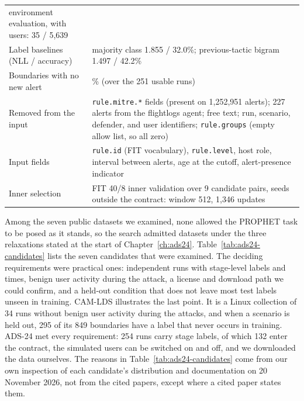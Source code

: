 \begin{table}[htbp]
\begin{tabularx}{\textwidth}{@{}>{\raggedright\arraybackslash}p{}>{\raggedright\arraybackslash}X@{}}
  environment evaluation, with users: 35 / 5,639 \\
Label baselines (NLL / accuracy) & majority class 1.855 / 32.0\%;
  previous-tactic bigram 1.497 / 42.2\% \\
Boundaries with no new alert & 14.7\% (over the 251 usable runs) \\
Removed from the input & \texttt{rule.mitre.*} fields (present on
  1,252,951 alerts); 227 alerts from the flightlogs agent; free text;
  run, scenario, defender, and user identifiers; \texttt{rule.groups}
  (empty allow list, so all zero) \\
Input fields & \texttt{rule.id} (FIT vocabulary), \texttt{rule.level},
  host role, interval between alerts, age at the cutoff, alert-presence
  indicator \\
Inner selection & FIT 40/8 inner validation over 9 candidate pairs,
  seeds outside the contract: window 512, 1,346 updates \\
\bottomrule
\end{tabularx}
\end{table}

Among the seven public datasets we examined, none allowed the PROPHET
task to be posed as it stands, so the search admitted datasets under the
three relaxations stated at the start of Chapter~\ref{ch:ads24}. Table~\ref{tab:ads24-candidates} lists
the seven candidates that were examined. The deciding requirements were
practical ones: independent runs with stage-level labels and times,
benign user activity during the attack, a license and download path we
could confirm, and a held-out condition that does not leave most test
labels unseen in training. CAM-LDS illustrates the last point. It is a
Linux collection of 34 runs without benign user activity during the
attacks, and when a scenario is held out, 295 of its 849 boundaries have
a label that never occurs in training. ADS-24 met every requirement:
254 runs carry stage labels, of which 132 enter the contract, the
simulated users can be switched on and off, and we downloaded the data
ourselves. The reasons in Table~\ref{tab:ads24-candidates} come from
our own inspection of each candidate's distribution and documentation
on 20 November 2026, not from the cited papers, except where a cited
paper states them.

